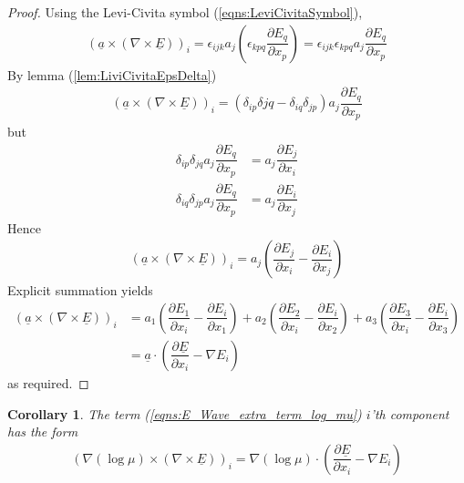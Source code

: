 \documentclass[12pt,twoside]{article}
\newtheorem{cor}{Corollary}[subsubsection]
\begin{document}
\begin{proof}
Using the Levi-Civita symbol (\ref{eqns:LeviCivitaSymbol}), 
\begin{align*}
\left( \underline{a} \times (\nabla \times \underline{E}) \right)_i  = \epsilon_{ijk}a_j\left( \epsilon_{kpq}\dfrac{\partial E_q}{\partial x_p} \right) = \epsilon_{ijk} \epsilon_{kpq} a_j \dfrac{\partial E_q}{\partial x_p}
\end{align*}
By lemma (\ref{lem:LiviCivitaEpsDelta})
\begin{align*}
\left( \underline{a} \times (\nabla \times \underline{E}) \right)_i  =  \left( \delta_{ip}\delta{jq} - \delta_{iq}\delta_{jp}\right) a_j \dfrac{\partial E_q}{\partial x_p}
\end{align*}
but
\begin{align*}
\delta_{ip}\delta_{jq}a_j \dfrac{\partial E_q}{\partial x_p} &= a_j \dfrac{\partial E_j}{\partial x_i} \\
\delta_{iq}\delta_{jp}a_j \dfrac{\partial E_q}{\partial x_p} &= a_j \dfrac{\partial E_i}{\partial x_j}
\end{align*}
Hence
\begin{align*}
\left( \underline{a} \times (\nabla \times \underline{E}) \right)_i = a_j\left( \dfrac{\partial E_j}{\partial x_i} - \dfrac{\partial E_i}{\partial x_j} \right)
\end{align*}
Explicit summation yields
\begin{align*}
\left( \underline{a} \times (\nabla \times \underline{E}) \right)_i &= 
a_1\left( \dfrac{\partial E_1}{\partial x_i} - \dfrac{\partial E_i}{\partial x_1} \right) +
a_2\left( \dfrac{\partial E_2}{\partial x_i} - \dfrac{\partial E_i}{\partial x_2} \right) +
a_3\left( \dfrac{\partial E_3}{\partial x_i} - \dfrac{\partial E_i}{\partial x_3} \right) \\
&= \underline{a} \cdot \left( \dfrac{\partial \underline{E}}{\partial x_i}- \nabla E_i \right)
\end{align*}
as required.
\end{proof}

\begin{cor}
The term (\ref{eqns:E_Wave_extra_term_log_mu}) $i$'th component has the form 
\begin{align}
\label{eqns:E_Wave_extra_term_log_mu_expanded}
\left( \nabla \left( \log \mu \right) \times \left(\nabla \times \underline{E} \right) \right)_i = 
\nabla (\log \mu) \cdot \left( \dfrac{\partial \underline{E}}{\partial x_i}- \nabla E_i \right)
\end{align}
\end{cor}
\end{document}
